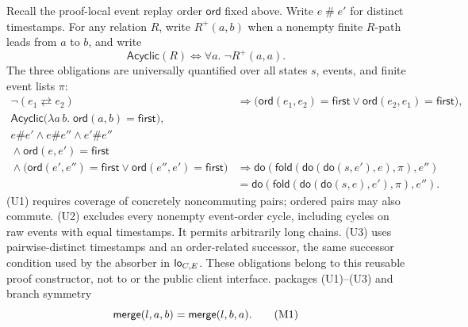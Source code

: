 Recall the proof-local event replay order $\mathsf{ord}$ fixed above. Write
$e\mathrel{\#}e'$ for distinct timestamps. For any relation
$R$, write $R^+(a,b)$ when a nonempty finite $R$-path leads from $a$ to $b$,
and write
\[
 \mathsf{Acyclic}(R)\Longleftrightarrow
 \forall a.\;\neg R^+(a,a).
\]
The three  obligations are universally quantified over
all states $s$, events, and finite event lists $\pi$:
\begin{align*}
 \neg(e_1\rightleftarrows e_2)
 &\Rightarrow
 \bigl(\mathsf{ord}(e_1,e_2)=\mathsf{first}\lor
       \mathsf{ord}(e_2,e_1)=\mathsf{first}\bigr),
 \tag*{(U1)}\\
 \mathsf{Acyclic}\bigl(\lambda a\,b.\;
       \mathsf{ord}(a,b)=\mathsf{first}\bigr),
 \tag*{(U2)}\\
 e\#e'\land e\#e''\land e'\#e''&{}
 \nonumber\\[-1mm]
 {}\land\mathsf{ord}(e,e')=\mathsf{first}&{}
 \nonumber\\[-1mm]
 {}\land\bigl(\mathsf{ord}(e',e'')=\mathsf{first}
       \lor\mathsf{ord}(e'',e')=\mathsf{first}\bigr)
 &\Rightarrow
 \mathsf{do}(\mathsf{fold}(\mathsf{do}(\mathsf{do}(s,e'),e),\pi),e'')
 \nonumber\\[-1mm]
 &=\mathsf{do}(\mathsf{fold}(\mathsf{do}(\mathsf{do}(s,e),e'),\pi),e'').
 \tag*{(U3)}
\end{align*}
(U1) requires coverage of concretely noncommuting pairs; ordered pairs may
also commute. (U2) excludes every nonempty event-order cycle, including cycles
on raw events with equal timestamps. It permits arbitrarily long chains.
(U3) uses pairwise-distinct timestamps and an order-related successor,
the same successor condition used by the absorber in $\lo_{C,E}$.
These obligations
belong to this reusable proof constructor, not to  or the public
client interface.  packages (U1)--(U3) and branch symmetry
\[
  \merge(l,a,b)=\merge(l,b,a).
  \tag*{(M1)}
\]

